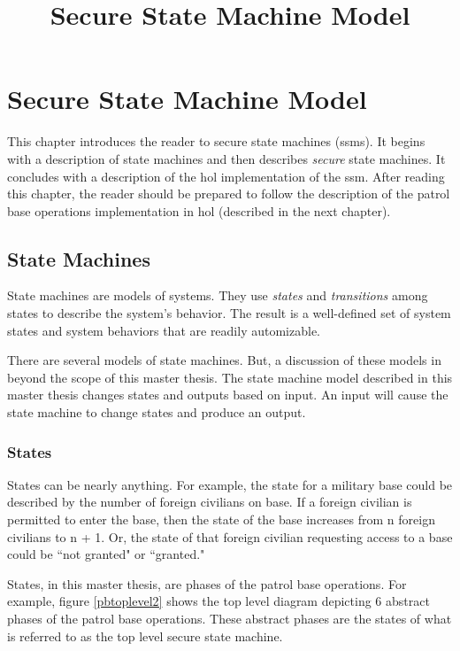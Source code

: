 \documentclass[../../main/main.tex]{subfiles}
\begin{document}
\title{Secure State Machine Model}

\chapter{Secure State Machine Model}\label{chp:ssmmodel}
This chapter introduces the reader to secure state machines (\gls{ssm}s).  It begins with a description of state machines and then describes \textit{secure} state machines.  It concludes with a description of the \gls{hol} implementation of the \gls{ssm}.  After reading this chapter, the reader should be prepared to follow the description of the patrol base operations implementation in \gls{hol} (described in the next chapter).

\section{State Machines}\label{sec:sm}
State machines are models of systems.  They use \textit{states} and \textit{transitions} among states to describe the system's behavior.  The result is a well-defined set of system states and system behaviors that are readily automizable.  


There are several models of state machines.  But, a discussion of these models in beyond the scope of this master thesis.  The state machine model described in this master thesis changes states and outputs based on input.  An input will cause the state machine to change states and produce an output.

\subsection{States}
States can be nearly anything.  For example, the state for a military base could be described by the number of foreign civilians on base.  If a foreign civilian is permitted to enter the base, then the state of the base increases from n foreign civilians to n + 1. Or, the state of that foreign civilian requesting access to a base could be ``not granted" or ``granted."

States, in this master thesis, are phases of the patrol base operations.  For example, figure \ref{pbtoplevel2} shows the top level diagram depicting 6 abstract phases of the patrol base operations.  These abstract phases are the states of what is referred to as the top level secure state machine.
\end{document}
